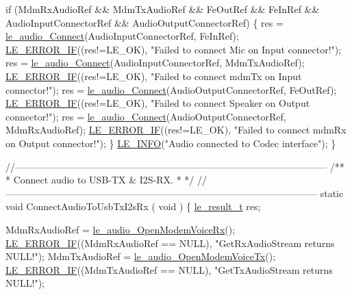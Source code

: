 \begin{DoxyCodeInclude}
{{{{    \textcolor{keywordflow}{if} (MdmRxAudioRef && MdmTxAudioRef && FeOutRef && FeInRef &&
        AudioInputConnectorRef && AudioOutputConnectorRef)
    \{
        res = \hyperlink{le__audio__interface_8h_a338df65b2fb1ae0140d86880adbcf0de}{le\_audio\_Connect}(AudioInputConnectorRef, FeInRef);
        \hyperlink{le__log_8h_aceaf11a11691d6c676e36dd317b38dbd}{LE\_ERROR\_IF}((res!=LE\_OK), \textcolor{stringliteral}{"Failed to connect Mic on Input connector!"});
        res = \hyperlink{le__audio__interface_8h_a338df65b2fb1ae0140d86880adbcf0de}{le\_audio\_Connect}(AudioInputConnectorRef, MdmTxAudioRef);
        \hyperlink{le__log_8h_aceaf11a11691d6c676e36dd317b38dbd}{LE\_ERROR\_IF}((res!=LE\_OK), \textcolor{stringliteral}{"Failed to connect mdmTx on Input connector!"});
        res = \hyperlink{le__audio__interface_8h_a338df65b2fb1ae0140d86880adbcf0de}{le\_audio\_Connect}(AudioOutputConnectorRef, FeOutRef);
        \hyperlink{le__log_8h_aceaf11a11691d6c676e36dd317b38dbd}{LE\_ERROR\_IF}((res!=LE\_OK), \textcolor{stringliteral}{"Failed to connect Speaker on Output connector!"});
        res = \hyperlink{le__audio__interface_8h_a338df65b2fb1ae0140d86880adbcf0de}{le\_audio\_Connect}(AudioOutputConnectorRef, MdmRxAudioRef);
        \hyperlink{le__log_8h_aceaf11a11691d6c676e36dd317b38dbd}{LE\_ERROR\_IF}((res!=LE\_OK), \textcolor{stringliteral}{"Failed to connect mdmRx on Output connector!"});
    \}
    \hyperlink{le__log_8h_a23e6d206faa64f612045d688cdde5808}{LE\_INFO}(\textcolor{stringliteral}{"Audio connected to Codec interface"});
\}

\textcolor{comment}{//--------------------------------------------------------------------------------------------------}\textcolor{comment}{}
\textcolor{comment}{/**}
\textcolor{comment}{ * Connect audio to USB-TX & I2S-RX.}
\textcolor{comment}{ *}
\textcolor{comment}{ */}
\textcolor{comment}{//--------------------------------------------------------------------------------------------------}
\textcolor{keyword}{static} \textcolor{keywordtype}{void} ConnectAudioToUsbTxI2sRx
(
    \textcolor{keywordtype}{void}
)
\{
    \hyperlink{le__basics_8h_a1cca095ed6ebab24b57a636382a6c86c}{le\_result\_t} res;

    MdmRxAudioRef = \hyperlink{le__audio__interface_8h_ae3ed568ba4d2763ea77e17e77b20ff02}{le\_audio\_OpenModemVoiceRx}();
    \hyperlink{le__log_8h_aceaf11a11691d6c676e36dd317b38dbd}{LE\_ERROR\_IF}((MdmRxAudioRef == NULL), \textcolor{stringliteral}{"GetRxAudioStream returns NULL!"});
    MdmTxAudioRef = \hyperlink{le__audio__interface_8h_ad745f008bb04873c817da7af3daf783d}{le\_audio\_OpenModemVoiceTx}();
    \hyperlink{le__log_8h_aceaf11a11691d6c676e36dd317b38dbd}{LE\_ERROR\_IF}((MdmTxAudioRef == NULL), \textcolor{stringliteral}{"GetTxAudioStream returns NULL!"});

}}}}
\end{DoxyCodeInclude}
